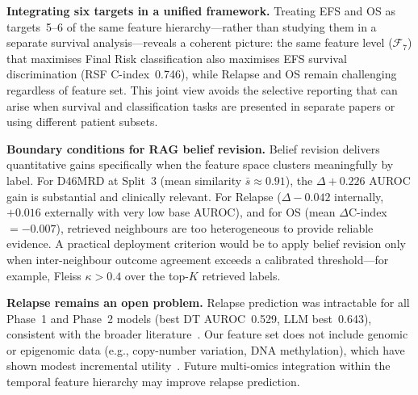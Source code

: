 \documentclass[pdflatex,sn-nature]{sn-jnl}
\begin{document}
\textbf{Integrating six targets in a unified framework.}
Treating EFS and OS as targets~5--6 of the same feature hierarchy—rather
than studying them in a separate survival analysis—reveals a coherent
picture: the same feature level ($\mathcal{F}_7$) that maximises
Final Risk classification also maximises EFS survival discrimination
(RSF C-index~0.746), while Relapse and OS remain challenging regardless
of feature set.
This joint view avoids the selective reporting that can arise when
survival and classification tasks are presented in separate papers or
using different patient subsets.

\textbf{Boundary conditions for RAG belief revision.}
Belief revision delivers quantitative gains specifically when the feature
space clusters meaningfully by label.
For D46MRD at Split~3 (mean similarity $\bar{s}\approx 0.91$), the
$\Delta+0.226$ AUROC gain is substantial and clinically relevant.
For Relapse ($\Delta-0.042$ internally, $+0.016$ externally with very
low base AUROC), and for OS (mean $\Delta$C-index $=-0.007$), retrieved
neighbours are too heterogeneous to provide reliable evidence.
A practical deployment criterion would be to apply belief revision
only when inter-neighbour outcome agreement exceeds a calibrated
threshold—for example, Fleiss $\kappa > 0.4$ over the top-$K$
retrieved labels.

\textbf{Relapse remains an open problem.}
Relapse prediction was intractable for all Phase~1 and Phase~2 models
(best DT AUROC~0.529, LLM best~0.643), consistent with the broader
literature~\cite{[CITE:Martinez2025],[CITE:Good2018]}.
Our feature set does not include genomic or epigenomic data (e.g.,
copy-number variation, DNA methylation), which have shown modest
incremental utility~\cite{[CITE:Mosquera2024]}.
Future multi-omics integration within the temporal feature hierarchy
may improve relapse prediction.
\end{document}
